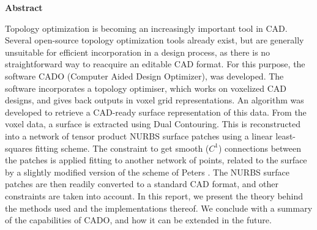 

\clearemptydoublepage
{}
{}	





\vspace*{2cm}
\begin{center}
{\Large \bf Abstract}
\end{center}
\vspace{1cm}

Topology optimization is becoming an increasingly important tool in CAD. Several open-source topology optimization tools already exist, but are generally unsuitable for efficient incorporation in a design process, as there is no straightforward way to reacquire an editable CAD format. For this purpose, the software CADO (Computer Aided Design Optimizer), was developed. The software incorporates a topology optimiser, which works on voxelized CAD designs, and gives back outputs in voxel grid representations. An algorithm was developed to retrieve a CAD-ready surface representation of this data. From the voxel data, a surface is extracted using Dual Contouring. This is reconstructed into a network of tensor product NURBS surface patches using a linear least-squares fitting scheme. The constraint to get smooth ($C^1$) connections between the patches is applied fitting to another network of points, related to the surface by a slightly modified version of the scheme of Peters \cite{peters1992constructing}. The NURBS surface patches are then readily converted to a standard CAD format, and other constraints are taken into account. In this report, we present the theory behind the methods used and the implementations thereof. We conclude with a summary of the capabilities of CADO, and how it can be extended in the future.
%
%
